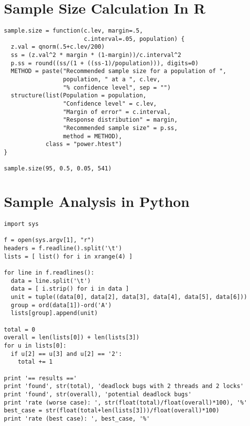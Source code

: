 \begin{appendices}

\chapter{Sample Size Calculation In R}

\noindent
\begin{verbatim}
sample.size = function(c.lev, margin=.5,
                       c.interval=.05, population) {
  z.val = qnorm(.5+c.lev/200)
  ss = (z.val^2 * margin * (1-margin))/c.interval^2
  p.ss = round((ss/(1 + ((ss-1)/population))), digits=0)
  METHOD = paste("Recommended sample size for a population of ",
                 population, " at a ", c.lev,
                 "% confidence level", sep = "")
  structure(list(Population = population,
                 "Confidence level" = c.lev,
                 "Margin of error" = c.interval,
                 "Response distribution" = margin,
                 "Recommended sample size" = p.ss,
                 method = METHOD),
            class = "power.htest")
}

sample.size(95, 0.5, 0.05, 541)
\end{verbatim}

\chapter{Sample Analysis in Python}

\noindent
\begin{verbatim}
import sys

f = open(sys.argv[1], "r")
headers = f.readline().split('\t')
lists = [ list() for i in xrange(4) ]

for line in f.readlines():
  data = line.split('\t')
  data = [ i.strip() for i in data ]
  unit = tuple((data[0], data[2], data[3], data[4], data[5], data[6]))
  group = ord(data[1])-ord('A')
  lists[group].append(unit)

total = 0
overall = len(lists[0]) + len(lists[3])
for u in lists[0]:
  if u[2] == u[3] and u[2] == '2':
    total += 1

print '== results =='
print 'found', str(total), 'deadlock bugs with 2 threads and 2 locks'
print 'found', str(overall), 'potential deadlock bugs'
print 'rate (worse case): ', str(float(total)/float(overall)*100), '%'
best_case = str(float(total+len(lists[3]))/float(overall)*100)
print 'rate (best case): ', best_case, '%'
\end{verbatim}



\end{appendices}
